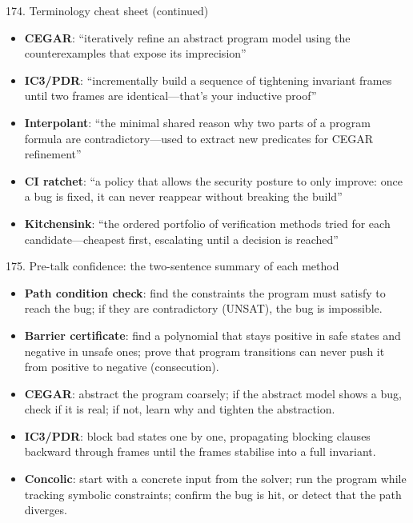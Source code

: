 \documentclass[aspectratio=169]{beamer}
\begin{document}
\begin{frame}{174. Terminology cheat sheet (continued)}
\begin{itemize}
  \item \textbf{CEGAR}: ``iteratively refine an abstract program model using the counterexamples that expose its imprecision''
  \item \textbf{IC3/PDR}: ``incrementally build a sequence of tightening invariant frames until two frames are identical---that's your inductive proof''
  \item \textbf{Interpolant}: ``the minimal shared reason why two parts of a program formula are contradictory---used to extract new predicates for CEGAR refinement''
  \item \textbf{CI ratchet}: ``a policy that allows the security posture to only improve: once a bug is fixed, it can never reappear without breaking the build''
  \item \textbf{Kitchensink}: ``the ordered portfolio of verification methods tried for each candidate---cheapest first, escalating until a decision is reached''
\end{itemize}
\end{frame}

\begin{frame}{175. Pre-talk confidence: the two-sentence summary of each method}
\begin{itemize}
  \item \textbf{Path condition check}: find the constraints the program must satisfy to reach the bug; if they are contradictory (UNSAT), the bug is impossible.
  \item \textbf{Barrier certificate}: find a polynomial that stays positive in safe states and negative in unsafe ones; prove that program transitions can never push it from positive to negative (consecution).
  \item \textbf{CEGAR}: abstract the program coarsely; if the abstract model shows a bug, check if it is real; if not, learn why and tighten the abstraction.
  \item \textbf{IC3/PDR}: block bad states one by one, propagating blocking clauses backward through frames until the frames stabilise into a full invariant.
  \item \textbf{Concolic}: start with a concrete input from the solver; run the program while tracking symbolic constraints; confirm the bug is hit, or detect that the path diverges.
\end{itemize}
\end{frame}
\end{document}
